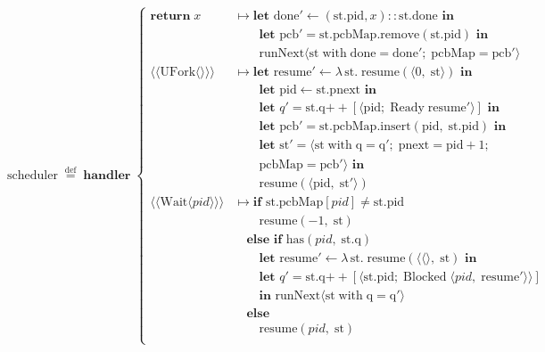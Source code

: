 \documentclass[logo,bsc,singlespacing,parskip]{infthesis}
\begin{document}
\[
\mathrm{scheduler} \;\overset{\mathrm{def}}{=}\;
\textbf{handler} \;\left\{
\begin{array}{ll}
  \mathbf{return}\; x 
    & \mapsto \textbf{let } \mathrm{done'} \leftarrow (\mathrm{st.pid}, x) :: \mathrm{st.done} \textbf{ in} \\
    & \quad\quad \textbf{let } \mathrm{pcb'} = \mathrm{st.pcbMap.remove}(\mathrm{st.pid}) \textbf{ in} \\
    & \quad\quad \mathrm{runNext} \langle \mathrm{st\; with\; done = done';\; pcbMap = pcb'} \rangle
    
    \\[1ex]

  \langle\!\langle \mathrm{UFork} \langle\rangle \rangle\!\rangle 
    & \mapsto \textbf{let } \mathrm{resume'} \leftarrow \lambda\, \mathrm{st}.\; \mathrm{resume}(\langle 0,\; \mathrm{st} \rangle) \textbf{ in} \\
    & \quad\quad \textbf{let } \mathrm{pid} \leftarrow \mathrm{st.pnext} \textbf{ in} \\
    & \quad\quad \textbf{let } q' = \mathrm{st.q} \mathbin{++} [\langle \mathrm{pid};\; \mathrm{Ready}\; \mathrm{resume'} \rangle] \textbf{ in} \\
    & \quad\quad \textbf{let } \mathrm{pcb'} = \mathrm{st.pcbMap.insert}(\mathrm{pid},\; \mathrm{st.pid}) \textbf{ in} \\
    & \quad\quad \textbf{let } \mathrm{st'} = \langle \mathrm{st\; with\; q = q';\; pnext = pid} + 1;\; \\ 
    & \quad\quad\mathrm{pcbMap = pcb'} \rangle \textbf{ in} \\
    & \quad\quad \mathrm{resume}(\langle \mathrm{pid},\; \mathrm{st'} \rangle) \\[1ex]

  \langle\!\langle \mathrm{Wait} \langle pid \rangle \rangle\!\rangle 
    & \mapsto \textbf{if } \mathrm{st.pcbMap}[pid] \neq \mathrm{st.pid} \\
    & \quad\quad  \mathrm{resume}(-1,\; \mathrm{st}) \\[0.5ex]
    & \quad \textbf{else if } \mathrm{has}(pid,\; \mathrm{st.q}) \\
    & \quad\quad \textbf{let } \mathrm{resume'} \leftarrow \lambda\, \mathrm{st}.\; \mathrm{resume}(\langle\langle\rangle,\; \mathrm{st}) \textbf{ in} \\
    & \quad\quad \textbf{let } q' = \mathrm{st.q} \mathbin{++} [\langle \mathrm{st.pid};\; \mathrm{Blocked}\; \langle pid,\; \mathrm{resume'} \rangle \rangle]  \\
    & \quad\quad\textbf{in } \mathrm{runNext} \langle \mathrm{st\; with\; q = q'} \rangle \\[0.5ex]
    & \quad \textbf{else } \\ 
    & \quad\quad\mathrm{resume}(pid,\; \mathrm{st}) 
    \\
    


\end{array}\]
\end{document}

